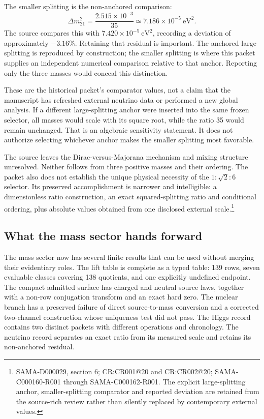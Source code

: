 The smaller splitting is the non-anchored comparison:
\begin{equation}
\Delta m_{21}^2=\frac{2.515\times10^{-3}}{35}
\simeq7.186\times10^{-5}\ \mathrm{eV}^2.
\end{equation}
The source compares this with $7.420\times10^{-5}\ \mathrm{eV}^2$, recording a deviation of approximately $-3.16\%$. Retaining that residual is important. The anchored large splitting is reproduced by construction; the smaller splitting is where this packet supplies an independent numerical comparison relative to that anchor. Reporting only the three masses would conceal this distinction.

These are the historical packet's comparator values, not a claim that the manuscript has refreshed external neutrino data or performed a new global analysis. If a different large-splitting anchor were inserted into the same frozen selector, all masses would scale with its square root, while the ratio 35 would remain unchanged. That is an algebraic sensitivity statement. It does not authorize selecting whichever anchor makes the smaller splitting most favorable.

The source leaves the Dirac-versus-Majorana mechanism and mixing structure unresolved. Neither follows from three positive masses and their ordering. The packet also does not establish the unique physical necessity of the $1:\sqrt2:6$ selector. Its preserved accomplishment is narrower and intelligible: a dimensionless ratio construction, an exact squared-splitting ratio and conditional ordering, plus absolute values obtained from one disclosed external scale.\footnote{SAMA-D000029, section 6; CR:CR001@20 and CR:CR002@20; SAMA-C000160-R001 through SAMA-C000162-R001. The explicit large-splitting anchor, smaller-splitting comparator and reported deviation are retained from the source-rich review rather than silently replaced by contemporary external values.}

\subsection{What the mass sector hands forward}

The mass sector now has several finite results that can be used without merging their evidentiary roles. The lift table is complete as a typed table: 139 rows, seven evaluable classes covering 138 quotients, and one explicitly undefined endpoint. The compact admitted surface has charged and neutral source laws, together with a non-row conjugation transform and an exact hard zero. The nuclear branch has a preserved failure of direct source-to-mass conversion and a corrected two-channel construction whose uniqueness test did not pass. The Higgs record contains two distinct packets with different operations and chronology. The neutrino record separates an exact ratio from its measured scale and retains its non-anchored residual.

